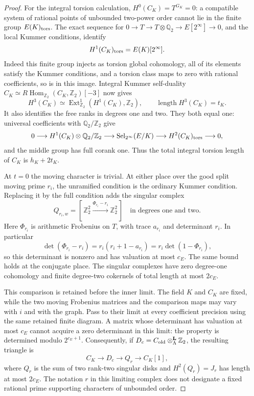\documentclass[11pt]{article}
\theoremstyle{definition}
\theoremstyle{remark}
\begin{document}
\begin{proof}
For the integral torsion calculation, $H^0(C_K)=T^{G_K}=0$:
a compatible system of rational points of unbounded two-power
order cannot lie in the finite group $E(K)_{\rm tors}$.
The exact sequence for $0\to T\to T\otimes\mathbb Q_2
\to E[2^\infty]\to0$, and the local Kummer conditions, identify
\[
 H^1(C_K)_{\rm tors}=E(K)[2^\infty].
\]
Indeed this finite group injects as torsion global cohomology,
all of its elements satisfy the Kummer conditions, and a torsion
class maps to zero with rational coefficients, so is in this
image. Integral Kummer self-duality
$C_K\simeq R\operatorname{Hom}_{\mathbb Z_2}
(C_K,\mathbb Z_2)[-3]$ now gives
\[
 H^3(C_K)\simeq
 \operatorname{Ext}^1_{\mathbb Z_2}(H^1(C_K),\mathbb Z_2),
 \qquad \operatorname{length}H^3(C_K)=t_K.                     \tag{5.7b}
\]
It also identifies the free ranks in degrees one and two.
They both equal one: universal coefficients with
$\mathbb Q_2/\mathbb Z_2$ give
\[
0\longrightarrow H^1(C_K)\otimes\mathbb Q_2/\mathbb Z_2
 \longrightarrow\operatorname{Sel}_{2^\infty}(E/K)
 \longrightarrow H^2(C_K)_{\rm tors}\longrightarrow0,
\]
and the middle group has full corank one. Thus the total integral
torsion length of $C_K$ is $h_K+2t_K$.

At $t=0$ the moving character is trivial. At either place over
the good split moving prime $r_i$, the unramified condition is
the ordinary Kummer condition. Replacing it by the full condition
adds the singular complex
\[
 Q_{r_i,w}=[\,\mathbb Z_2^2
       \xrightarrow{\Phi_{r_i}-r_i}\mathbb Z_2^2\,]
       \quad\text{in degrees one and two}.
\]
Here $\Phi_{r_i}$ is arithmetic Frobenius on $T$, with trace
$a_{r_i}$ and determinant $r_i$. In particular
\[
 \det(\Phi_{r_i}-r_i)
   =r_i(r_i+1-a_{r_i})
   =r_i\det(1-\Phi_{r_i}),
\]
so this determinant is nonzero and has valuation at most $c_E$.
The same bound holds at the conjugate place. The singular
complexes have zero degree-one cohomology and finite degree-two
cokernels of total length at most $2c_E$.

This comparison is retained before the inner limit. The field
$K$ and $C_K$ are fixed, while the two moving Frobenius matrices
and the comparison maps may vary with $i$ and with the graph.
Pass to their limit at every coefficient precision using the
same retained finite diagram. A matrix whose determinant has
valuation at most $c_E$ cannot acquire a zero determinant in
this limit: the property is determined modulo $2^{c_E+1}$.
Consequently, if
$D_c=C_{\rm old}\otimes^{\mathbf L}_\Lambda\mathbb Z_2$,
the resulting triangle is
\[
 C_K\longrightarrow D_c\longrightarrow Q_r
      \longrightarrow C_K[1],                               \tag{5.7c}
\]
where $Q_r$ is the sum of two rank-two singular disks and
$H^2(Q_r)=J_r$ has length at most $2c_E$. The notation $r$
in this limiting complex does not designate a fixed rational
prime supporting characters of unbounded order.


\end{proof}
\end{document}
